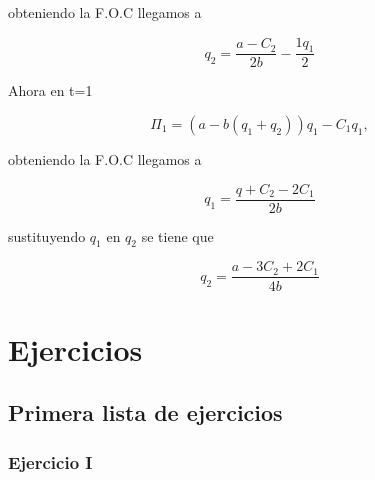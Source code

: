 \documentclass[letterpaper,12pt,twocolumn]{report}
\begin{document}
obteniendo la F.O.C llegamos a

$$ q_2 = \frac{a-C_2}{2b}-\frac{1q_1}{2} $$

Ahora en t=1

$$ \Pi_1 = (a-b(q_1+q_2))q_1-C_1q_1, $$

obteniendo la F.O.C llegamos a

$$ q_1=\frac{q+C_2-2C_1}{2b}$$

sustituyendo $q_1$ en $q_2$ se tiene que 

$$ q_2= \frac{a-3C_2+2C_1}{4b} $$

\chapter{Ejercicios}

\section{Primera lista de ejercicios}

\subsection*{Ejercicio I}
\end{document}

